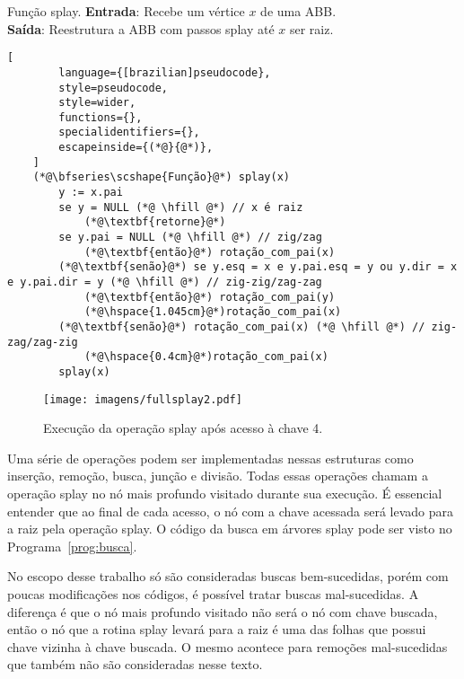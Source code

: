 \begin{programruledcaption}{Função splay.\label{prog:splay}}
    \noindent\textbf{Entrada}: Recebe um vértice $x$ de uma ABB.\\
    \textbf{Saída}: Reestrutura a ABB com passos splay até $x$ ser raiz. 
    \vspace{-0.5\baselineskip}
    \begin{lstlisting}[
        language={[brazilian]pseudocode},
        style=pseudocode,
        style=wider,
        functions={},
        specialidentifiers={},
        escapeinside={(*@}{@*)},
    ]
    (*@\bfseries\scshape{Função}@*) splay(x)
        y := x.pai
        se y = NULL (*@ \hfill @*) // x é raiz
            (*@\textbf{retorne}@*)
        se y.pai = NULL (*@ \hfill @*) // zig/zag
            (*@\textbf{então}@*) rotação_com_pai(x)
        (*@\textbf{senão}@*) se y.esq = x e y.pai.esq = y ou y.dir = x e y.pai.dir = y (*@ \hfill @*) // zig-zig/zag-zag
            (*@\textbf{então}@*) rotação_com_pai(y)
            (*@\hspace{1.045cm}@*)rotação_com_pai(x)
        (*@\textbf{senão}@*) rotação_com_pai(x) (*@ \hfill @*) // zig-zag/zag-zig
            (*@\hspace{0.4cm}@*)rotação_com_pai(x)
        splay(x)
    \end{lstlisting}
    \vspace{-0.5\baselineskip}
\end{programruledcaption}

\begin{figure}
    \texttt{[image: imagens/fullsplay2.pdf]}
    \caption{Execução da operação splay após acesso à chave 4.}
\label{fig:fullsplay}
\end{figure}

Uma série de operações podem ser implementadas nessas estruturas como inserção, remoção, busca, junção e divisão. Todas essas operações chamam a operação splay no nó mais profundo visitado durante sua execução. É essencial entender que ao final de cada acesso, o nó com a chave acessada será levado para a raiz pela operação splay. O código da busca em árvores splay pode ser visto no Programa~\ref{prog:busca}.

No escopo desse trabalho só são consideradas buscas bem-sucedidas, porém com poucas modificações nos códigos, é possível tratar buscas mal-sucedidas. A diferença é que o nó mais profundo visitado não será o nó com chave buscada, então o nó que a rotina splay levará para a raiz é uma das folhas que possui chave vizinha à chave buscada. O mesmo acontece para remoções mal-sucedidas que também não são consideradas nesse texto.

